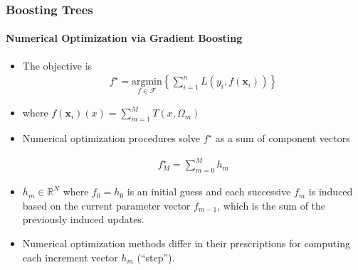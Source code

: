 \documentclass[
  shownotes,
  xcolor={svgnames},
  hyperref={colorlinks,citecolor=DarkBlue,linkcolor=DarkRed,urlcolor=DarkBlue}
  , aspectratio=169]{beamer}
\begin{document}
\begin{frame}[fragile]
\frametitle{Boosting Trees}
\framesubtitle{Numerical Optimization via Gradient Boosting}

\begin{itemize}
\item The objective is
\begin{align}
f^\star=\underset{f\in\mathcal{F}}{\text{argmin}}\left\lbrace \sum_{i=1}^n L(y_i,f(\mathbf{x}_i)) \right\rbrace
\end{align}

\item where $f(\mathbf{x}_i)(x)=\sum_{m=1}^MT(x,\Omega_m)$

\item Numerical optimization procedures solve $f^\star$ as a sum of component vectors

\begin{align}
f^\star_M=\sum_{m=0}^M h_m
\end{align}

\item $h_m\in \mathbb{R}^N$ where $f_0 =h_0$ is an initial guess and each successive $f_m$ is induced based on  the current parameter vector $f_{m-1}$, which is the sum of the previously induced updates. 
\item Numerical optimization methods differ in their prescriptions for computing each increment vector $h_m$ (“step”).
\end{itemize}

\end{frame}
\end{document}
